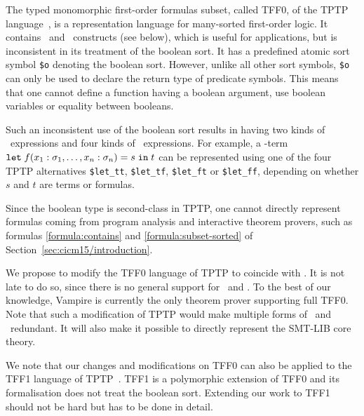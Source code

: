The typed monomorphic first-order formulas subset, called TFF0, of the TPTP language~\cite{TPTP}, is a representation language for many-sorted first-order logic. It contains \ITE\ and \LETIN\ constructs (see below), which is useful for applications, but is inconsistent in its treatment of the boolean sort. It has a predefined atomic sort symbol \lstinline'$o' denoting the boolean sort. However, unlike all other sort symbols, \lstinline'$o' can only be used to declare the return type of predicate symbols. This means that one cannot define a function having a boolean argument, use boolean variables or equality between booleans. 

Such an inconsistent use of the boolean sort results in having two kinds of \ITE\ expressions and four kinds of \LETIN\ expressions. For example, a \folb-term $\mathtt{let}\;{f(x_1:\sigma_1, \ldots, x_n:\sigma_n)}={s}\;\allowbreak\mathtt{in}\;{t}$ can be represented using one of the four TPTP alternatives \lstinline'$let_tt', \lstinline'$let_tf', \lstinline'$let_ft' or \lstinline'$let_ff', depending on whether $s$ and $t$ are terms or formulas. 

Since the boolean type is second-class in TPTP, one cannot directly represent formulas coming from program analysis and interactive theorem provers, such as formulas \eqref{formula:contains} and \eqref{formula:subset-sorted} of Section~\ref{sec:cicm15/introduction}.

We propose to modify the TFF0 language of TPTP to coincide with \folb. It is not late to do so, since there is no general support for \ITE\ and \LETIN. To the best of our knowledge, Vampire is currently the only theorem prover supporting full TFF0. Note that such a modification of TPTP would make multiple forms of \ITE\ and \LETIN\ redundant. It will also make it possible to directly represent the SMT-LIB core theory.

We note that our changes and modifications on TFF0 can also be applied to the TFF1 language of TPTP~\cite{tff1}. TFF1 is  a polymorphic extension of TFF0 and its formalisation  does not treat the boolean sort. Extending our work to TFF1 should not be hard but has to be done in detail.